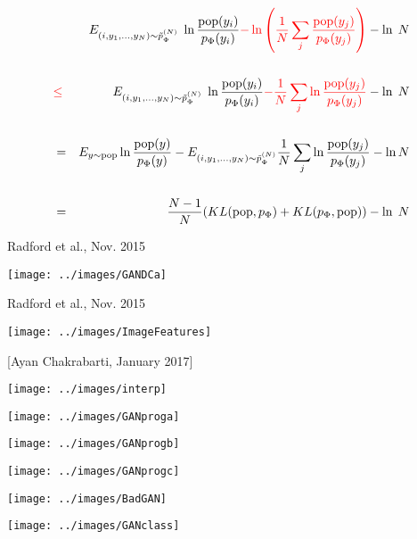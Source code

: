 {
{\huge
 \begin{eqnarray*}
    & & E_{(i,y_1,\ldots,y_{N}) \sim \tilde{p}_\Phi^{(N)}}\;\ln\frac{\mathrm{pop}(y_i)}{p_\Phi(y_i)} {\color{red} - \ln\left(\frac{1}{N}\sum_j \frac{\mathrm{pop}(y_j)}{p_\Phi(y_j)} \right)} - \ln\;N \\
    \\
    & {\color{red} \leq} & E_{(i,y_1,\ldots,y_{N}) \sim \tilde{p}_\Phi^{(N)}}\;\ln\frac{\mathrm{pop}(y_i)}{p_\Phi(y_i)} {\color{red} - \frac{1}{N} \sum_j \ln\frac{\mathrm{pop}(y_j)}{p_\Phi(y_j)}} - \ln\;N \\
    \\
    & = & E_{y \sim \mathrm{pop}} \ln \frac{\mathrm{pop}(y)}{p_\Phi(y)} -  E_{(i,y_1,\ldots,y_N) \sim \tilde{p}^{(N)}_\Phi} \frac{1}{N} \sum_j \ln\frac{\mathrm{pop}(y_j)}{p_\Phi(y_j)} - \ln N \\
    \\
    & = & \frac{N-1}{N}(KL(\mathrm{pop},p_\Phi) + KL(p_\Phi,\mathrm{pop})) - \ln\;N \\
  \end{eqnarray*}
}

{Radford et al., Nov. 2015}

\centerline{\texttt{[image: ../images/GANDCa]}}

{Radford et al., Nov. 2015}

\centerline{\texttt{[image: ../images/ImageFeatures]}}


[Ayan Chakrabarti, January 2017]

\centerline{\texttt{[image: ../images/interp]}}

\centerline{\texttt{[image: ../images/GANproga]}}

\centerline{\texttt{[image: ../images/GANprogb]}}

\centerline{\texttt{[image: ../images/GANprogc]}}


\centerline{\texttt{[image: ../images/BadGAN]}}


\centerline{\texttt{[image: ../images/GANclass]}}

}
